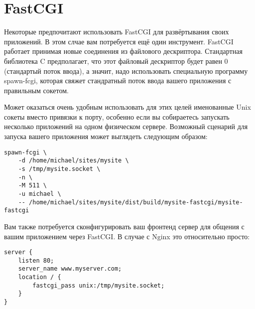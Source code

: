 \section{FastCGI}
%
%
Некоторые предпочитают использовать FastCGI для развёртывания своих приложений. В этом слчае вам потребуется ещё один инструмент. FastCGI работает принимая новые соединения из файлового дескриптора. Стандартная библиотека C предполагает, что этот файловый дескриптор будет равен 0 (стандартый поток ввода), а значит, надо использовать специальную программу spawn-fcgi, которая свяжет стандратный поток ввода вашего приложения с правильным сокетом.

Может оказаться очень удобным использовать для этих целей именованные Unix сокеты вместо привязки к порту, особенно если вы собираетесь запускать несколько приложений на одном физическом сервере. Возможный сценарий для запуска вашего приложения может выглядеть следующим образом:

\begin{lstlisting}
spawn-fcgi \
    -d /home/michael/sites/mysite \
    -s /tmp/mysite.socket \
    -n \
    -M 511 \
    -u michael \
    -- /home/michael/sites/mysite/dist/build/mysite-fastcgi/mysite-fastcgi
\end{lstlisting}
%

Вам также потребуется сконфигурировать ваш фронтенд сервер для общения с вашим приложением через FastCGI. В случае с Nginx это относительно просто:
%
\begin{lstlisting}
server {
    listen 80;
    server_name www.myserver.com;
    location / {
        fastcgi_pass unix:/tmp/mysite.socket;
    }
}
\end{lstlisting}
%

